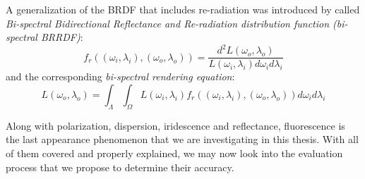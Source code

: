 A generalization of the BRDF that includes re-radiation was introduced by \citet{hullin2010acquisition} called \emph{Bi-spectral Bidirectional Reflectance and Re-radiation distribution function (bi-spectral BRRDF)}:
\begin{equation}
f_r((\omega_i,\lambda_i),(\omega_o,\lambda_o))=\frac{d^2L(\omega_o,\lambda_o)}{L(\omega_i,\lambda_i)d\omega_i d\lambda_i}
\end{equation}
and the corresponding \emph{bi-spectral rendering equation}:
\begin{equation}
L(\omega_o,\lambda_o)=\int_{\Lambda}\int_{\Omega}L(\omega_i,\lambda_i)f_r((\omega_i,\lambda_i),(\omega_o,\lambda_o))d\omega_i d\lambda_i
\end{equation}

Along with polarization, dispersion, iridescence and reflectance, fluorescence is the last appearance phenomenon that we are investigating in this thesis. With all of them covered and properly explained, we may now look into the evaluation process that we propose to determine their accuracy.